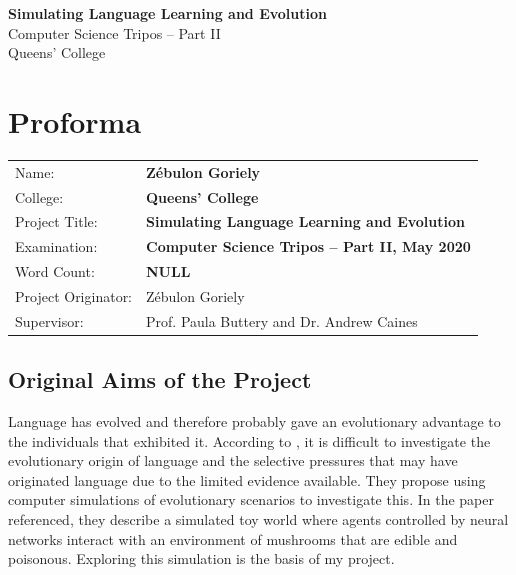 \documentclass[12pt,a4paper,twoside,openright]{report}
\begin{document}


\pagestyle{empty}

\vspace*{2mm}
\rightline{\Large \today}

\vspace*{60mm}
\begin{center}
\Huge
\textbf{Simulating Language Learning and Evolution} \\[5mm]
Computer Science Tripos -- Part II \\[5mm]
Queens' College \\[5mm]
\end{center}


\pagestyle{plain}

\chapter*{Proforma}

{\large
\begin{tabular}{ll}
Name:               & \bf Z\'ebulon Goriely                       \\
College:            & \bf Queens' College                     \\
Project Title:      & \bf Simulating Language Learning and Evolution \\
Examination:        & \bf Computer Science Tripos -- Part II, May 2020  \\
Word Count:         & \bf NULL\footnotemark[1]  \\
Project Originator: & Z\'ebulon Goriely                    \\
Supervisor:         & Prof. Paula Buttery and Dr. Andrew Caines                  \\ 
\end{tabular}
}


\section*{Original Aims of the Project}

Language has evolved and therefore probably gave an evolutionary advantage to the individuals that exhibited it. According to \citet{Cangelosi1998}, it is difficult to investigate the evolutionary origin of language and the selective pressures that may have originated language due to the limited evidence available. They propose using computer simulations of evolutionary scenarios to investigate this. In the paper referenced, they describe a simulated toy world where agents controlled by neural networks interact with an environment of mushrooms that are edible and poisonous. Exploring this simulation is the basis of my project.
\end{document}
